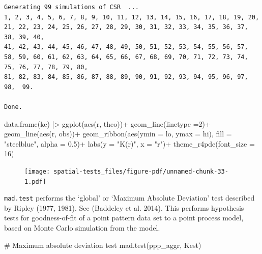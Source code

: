 \documentclass[
  letterpaper,
]{book}
\newenvironment{Shaded}{\begin{snugshade}}{\end{snugshade}}
\newcommand{\AttributeTok}[1]{\textcolor[rgb]{0.40,0.45,0.13}{#1}}
\newcommand{\CommentTok}[1]{\textcolor[rgb]{0.37,0.37,0.37}{#1}}
\newcommand{\DecValTok}[1]{\textcolor[rgb]{0.68,0.00,0.00}{#1}}
\newcommand{\FloatTok}[1]{\textcolor[rgb]{0.68,0.00,0.00}{#1}}
\newcommand{\FunctionTok}[1]{\textcolor[rgb]{0.28,0.35,0.67}{#1}}
\newcommand{\NormalTok}[1]{\textcolor[rgb]{0.00,0.23,0.31}{#1}}
\newcommand{\SpecialCharTok}[1]{\textcolor[rgb]{0.37,0.37,0.37}{#1}}
\newcommand{\StringTok}[1]{\textcolor[rgb]{0.13,0.47,0.30}{#1}}
\begin{document}
\begin{verbatim}
Generating 99 simulations of CSR  ...
1, 2, 3, 4, 5, 6, 7, 8, 9, 10, 11, 12, 13, 14, 15, 16, 17, 18, 19, 20, 21, 22, 23, 24, 25, 26, 27, 28, 29, 30, 31, 32, 33, 34, 35, 36, 37, 38, 39, 40,
41, 42, 43, 44, 45, 46, 47, 48, 49, 50, 51, 52, 53, 54, 55, 56, 57, 58, 59, 60, 61, 62, 63, 64, 65, 66, 67, 68, 69, 70, 71, 72, 73, 74, 75, 76, 77, 78, 79, 80,
81, 82, 83, 84, 85, 86, 87, 88, 89, 90, 91, 92, 93, 94, 95, 96, 97, 98,  99.

Done.
\end{verbatim}

\begin{Shaded}
\begin{Highlighting}[]
\FunctionTok{data.frame}\NormalTok{(ke) }\SpecialCharTok{|\textgreater{}} 
  \FunctionTok{ggplot}\NormalTok{(}\FunctionTok{aes}\NormalTok{(r, theo))}\SpecialCharTok{+}
  \FunctionTok{geom\_line}\NormalTok{(}\AttributeTok{linetype =}\DecValTok{2}\NormalTok{)}\SpecialCharTok{+}
  \FunctionTok{geom\_line}\NormalTok{(}\FunctionTok{aes}\NormalTok{(r, obs))}\SpecialCharTok{+}
  \FunctionTok{geom\_ribbon}\NormalTok{(}\FunctionTok{aes}\NormalTok{(}\AttributeTok{ymin =}\NormalTok{ lo, }\AttributeTok{ymax =}\NormalTok{ hi),}
              \AttributeTok{fill =} \StringTok{"steelblue"}\NormalTok{, }\AttributeTok{alpha =} \FloatTok{0.5}\NormalTok{)}\SpecialCharTok{+}
  \FunctionTok{labs}\NormalTok{(}\AttributeTok{y =} \StringTok{"K(r)"}\NormalTok{, }\AttributeTok{x =} \StringTok{"r"}\NormalTok{)}\SpecialCharTok{+}
  \FunctionTok{theme\_r4pde}\NormalTok{(}\AttributeTok{font\_size =} \DecValTok{16}\NormalTok{)}
\end{Highlighting}
\end{Shaded}

\begin{figure}[H]

{\centering \texttt{[image: spatial-tests\_files/figure-pdf/unnamed-chunk-33-1.pdf]}

}

\end{figure}

\texttt{mad.test} performs the `global' or `Maximum Absolute Deviation'
test described by Ripley (1977, 1981). See (Baddeley et al. 2014). This
performs hypothesis tests for goodness-of-fit of a point pattern data
set to a point process model, based on Monte Carlo simulation from the
model.

\begin{Shaded}
\begin{Highlighting}[]
\CommentTok{\# Maximum absolute deviation test}
\FunctionTok{mad.test}\NormalTok{(ppp\_aggr, Kest)}
\end{Highlighting}
\end{Shaded}
\end{document}
